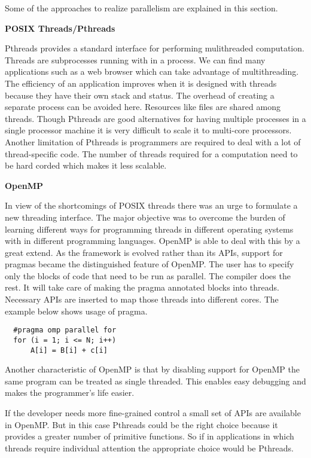 Some of the approaches to realize parallelism are explained in this section.

\noindent
\textbf{POSIX Threads/Pthreads}

\noindent
Pthreads provides a standard interface for performing mulithreaded computation. 
Threads are subprocesses running with in a process. 
We can find many applications such as a web browser which can take advantage of multithreading.
The efficiency of an application improves when it is designed with threads because they have their
own stack and status. The overhead of creating a separate process can be avoided here.
Resources like files are shared among threads. Though Pthreads are good alternatives for
having multiple processes in a single processor machine it is very difficult to scale
it to multi-core processors. Another limitation of Pthreads is programmers are required to
deal with a lot of thread-specific code. The number of threads required for a computation
need to be hard corded which makes it less scalable.


\noindent
\textbf{OpenMP}

\noindent
In view of the shortcomings of POSIX threads there was an urge to formulate a new threading
interface. The major objective was to overcome the burden of learning different ways for programming threads in different
operating systems with in different programming languages. OpenMP is able to deal with this
by a great extend. As the framework is evolved rather than its APIs, support for pragmas became the distinguished
feature of OpenMP. The user has to specify only the blocks of code that need to be run
as parallel. The compiler does the rest. It will take care of making the pragma annotated blocks into
threads. Necessary APIs are inserted to map those threads into different cores. The example below
shows usage of pragma.

{\footnotesize
\begin{lstlisting}
  #pragma omp parallel for
  for (i = 1; i <= N; i++)
      A[i] = B[i] + c[i]
\end{lstlisting}
}

Another characteristic of OpenMP is that by disabling support for OpenMP the same program can be treated as
single threaded. This enables easy debugging and makes the programmer's life easier.

If the developer needs more fine-grained control a small set of APIs are available in OpenMP. But in this case Pthreads
could be the right choice because it provides a greater number of primitive functions. So if in applications
in which threads require individual attention the appropriate choice would be Pthreads.

